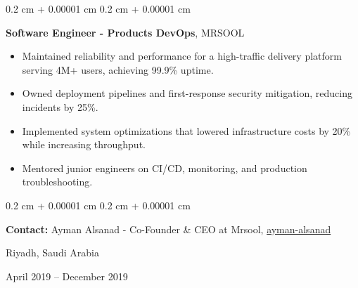 \documentclass[10pt, letterpaper]{article}
\newenvironment{highlights}{
    \begin{itemize}[
        topsep=0.10 cm,
        parsep=0.10 cm,
        partopsep=0pt,
        itemsep=0pt,
        leftmargin=0.4 cm + 10pt
    ]
}{
    \end{itemize}
} %
\newenvironment{onecolentry}{
    \begin{adjustwidth}{
        0.2 cm + 0.00001 cm
    }{
        0.2 cm + 0.00001 cm
    }
}{
    \end{adjustwidth}
} %
\newenvironment{twocolentry}[2][]{
    \onecolentry
    \def\secondColumn{#2}
    \setcolumnwidth{\fill, 4.5 cm}
    \begin{paracol}{2}
}{
    \switchcolumn \raggedleft \secondColumn
    \end{paracol}
    \endonecolentry
} %
\let\hrefWithoutArrow\href
\renewcommand{\href}[2]{\hrefWithoutArrow{#1}{\ifthenelse{\equal{#2}{}}{ }{#2 }\raisebox{.15ex}{\footnotesize \faExternalLink*}}}
\begin{document}
    \begin{twocolentry}{
        Riyadh, Saudi Arabia

        April 2019 – December 2019
    }
        \textbf{Software Engineer - Products DevOps}, MRSOOL
        \begin{highlights}
            \item Maintained reliability and performance for a high-traffic delivery platform serving 4M+ users, achieving 99.9\% uptime.
            \item Owned deployment pipelines and first-response security mitigation, reducing incidents by 25\%.
            \item Implemented system optimizations that lowered infrastructure costs by 20\% while increasing throughput.
            \item Mentored junior engineers on CI/CD, monitoring, and production troubleshooting.
        \end{highlights}

        \begin{onecolentry}
            \textbf{Contact:} Ayman Alsanad - Co-Founder \& CEO at Mrsool,
            \mbox{\hrefWithoutArrow{https://www.linkedin.com/in/ayman-alsanad-3817274/}{{\footnotesize\faLinkedinIn}\hspace*{0.13cm}ayman-alsanad}}%
        \end{onecolentry}
    \end{twocolentry}

    \vspace{0.2 cm}
\end{document}
